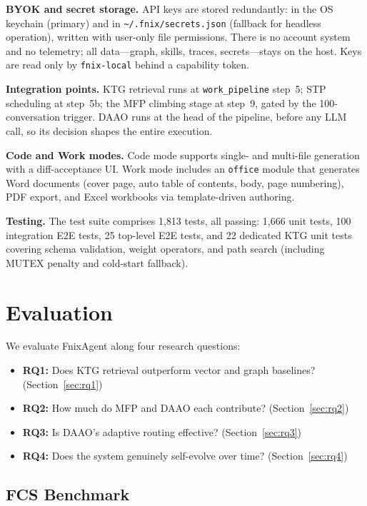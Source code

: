 \documentclass[sigconf]{acmart}
\begin{document}
\textbf{BYOK and secret storage.} API keys are stored redundantly: in the OS keychain (primary) and in \texttt{\textasciitilde/.fnix/secrets.json} (fallback for headless operation), written with user-only file permissions. There is no account system and no telemetry; all data---graph, skills, traces, secrets---stays on the host. Keys are read only by \texttt{fnix-local} behind a capability token.

\textbf{Integration points.} KTG retrieval runs at \texttt{work\_pipeline} step~5; STP scheduling at step~5b; the MFP climbing stage at step~9, gated by the 100-conversation trigger. DAAO runs at the head of the pipeline, before any LLM call, so its decision shapes the entire execution.

\textbf{Code and Work modes.} Code mode supports single- and multi-file generation with a diff-acceptance UI. Work mode includes an \texttt{office} module that generates Word documents (cover page, auto table of contents, body, page numbering), PDF export, and Excel workbooks via template-driven authoring.

\textbf{Testing.} The test suite comprises 1{,}813 tests, all passing: 1{,}666 unit tests, 100 integration E2E tests, 25 top-level E2E tests, and 22 dedicated KTG unit tests covering schema validation, weight operators, and path search (including MUTEX penalty and cold-start fallback).

\section{Evaluation}\label{sec:eval}

We evaluate FnixAgent along four research questions:

\begin{itemize}
  \item \textbf{RQ1:} Does KTG retrieval outperform vector and graph baselines? (Section~\ref{sec:rq1})
  \item \textbf{RQ2:} How much do MFP and DAAO each contribute? (Section~\ref{sec:rq2})
  \item \textbf{RQ3:} Is DAAO's adaptive routing effective? (Section~\ref{sec:rq3})
  \item \textbf{RQ4:} Does the system genuinely self-evolve over time? (Section~\ref{sec:rq4})
\end{itemize}

\subsection{FCS Benchmark}\label{sec:fcs}
\end{document}
